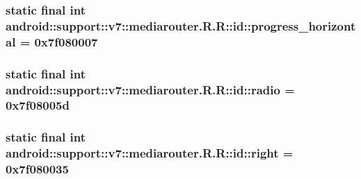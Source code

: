 \hypertarget{classandroid_1_1support_1_1v7_1_1mediarouter_1_1_r_1_1id_a74236551439def093e0dc3758419be4}{
\subsubsection[{progress\_\-horizontal}]{\setlength{\rightskip}{0pt plus 5cm}static final int android::support::v7::mediarouter.R.R::id::progress\_\-horizontal = 0x7f080007}}
\label{classandroid_1_1support_1_1v7_1_1mediarouter_1_1_r_1_1id_a74236551439def093e0dc3758419be4}


\hypertarget{classandroid_1_1support_1_1v7_1_1mediarouter_1_1_r_1_1id_8e4cdbb07e0b7dd3cb6a3720120db2c9}{
\subsubsection[{radio}]{\setlength{\rightskip}{0pt plus 5cm}static final int android::support::v7::mediarouter.R.R::id::radio = 0x7f08005d}}
\label{classandroid_1_1support_1_1v7_1_1mediarouter_1_1_r_1_1id_8e4cdbb07e0b7dd3cb6a3720120db2c9}


\hypertarget{classandroid_1_1support_1_1v7_1_1mediarouter_1_1_r_1_1id_cb40a25faad91aa9b420e7487371ec40}{
\subsubsection[{right}]{\setlength{\rightskip}{0pt plus 5cm}static final int android::support::v7::mediarouter.R.R::id::right = 0x7f080035}}
\label{classandroid_1_1support_1_1v7_1_1mediarouter_1_1_r_1_1id_cb40a25faad91aa9b420e7487371ec40}


